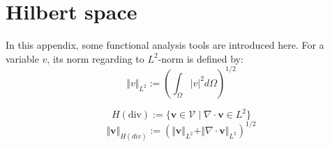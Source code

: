 \section{Hilbert space}
In this appendix, some functional analysis tools are introduced here. For a variable $v$, its norm regarding to $L^2$-norm is defined by:
\begin{equation}
    \Vert v \Vert_{L^2} := \left ( \int_{\Omega} \vert v \vert^2 d\Omega \right )^{1/2}
\end{equation}

\begin{equation}
    H(\mathrm{div}) := \{ \boldsymbol v \in \mathcal V \; \vert \; \nabla \cdot \boldsymbol v \in L^2\}
\end{equation}
\begin{equation}
    \Vert \boldsymbol v \Vert_{H(div)} := \left ( \Vert \boldsymbol v \Vert_{L^2} + \Vert \nabla \cdot \boldsymbol v \Vert_{L^2} \right )^{1/2}
\end{equation}
